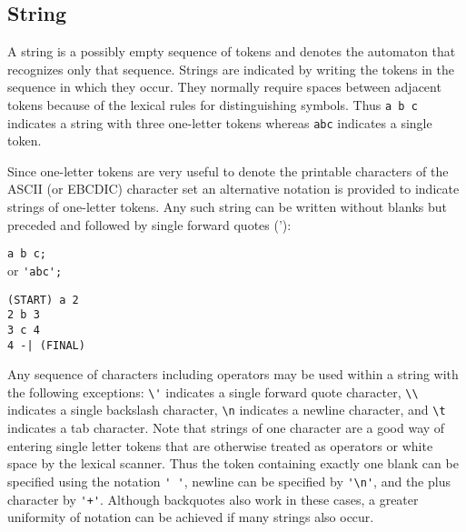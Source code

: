 \subsection{String}
A string is a possibly empty sequence of tokens and denotes the automaton
that recognizes only that sequence.
Strings are indicated by writing the tokens in the sequence in which they
occur.
They normally require spaces between adjacent tokens because of the
lexical rules for distinguishing symbols.
Thus \verb#a b c# indicates a string with three one-letter tokens whereas
\verb#abc# indicates a single token.

Since one-letter tokens are very useful to denote the printable characters
of the ASCII (or EBCDIC) character set an alternative notation is provided
to indicate strings of one-letter tokens.
Any such string can be written without blanks but preceded and followed
by single forward quotes ('):
\begin{center}\begin{minipage}[t]{3in}\begin{minipage}[t]{3in}\begin{tabbing}
\qquad \= \verb#a b c;#\\
or \> \verb#'abc';#
\end{tabbing}\end{minipage}\end{minipage}
\begin{minipage}[t]{1.6in}\begin{verbatim}
(START) a 2
2 b 3
3 c 4
4 -| (FINAL)
\end{verbatim}\end{minipage}\end{center}

Any sequence of characters including operators may be used within a string 
with the following exceptions: \verb#\'# indicates a single forward
quote character, \verb#\\# indicates a single backslash character,
\verb#\n# indicates a newline character, and \verb#\t# indicates a tab
character.
Note that strings of one character are a good way of entering single letter
tokens that are otherwise treated as operators or white space by the
lexical scanner.
Thus the token containing exactly one blank can be specified using the
notation \verb#' '#, newline can be specified by \verb#'\n'#, and the plus
character by \verb#'+'#.
Although backquotes also work in these cases, a greater uniformity of
notation can be achieved if many strings also occur.

